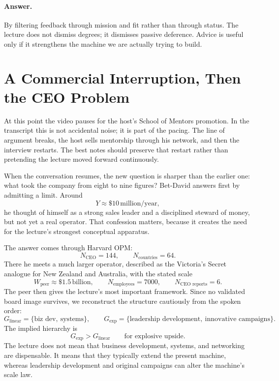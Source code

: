 \paragraph{Answer.} By filtering feedback through mission and fit rather than through status. The lecture does not dismiss degrees; it dismisses passive deference. Advice is useful only if it strengthens the machine we are actually trying to build.

\section{A Commercial Interruption, Then the CEO Problem}

At this point the video pauses for the host's School of Mentors promotion. In the transcript this is not accidental noise; it is part of the pacing. The line of argument breaks, the host sells mentorship through his network, and then the interview restarts. The best notes should preserve that restart rather than pretending the lecture moved forward continuously.

When the conversation resumes, the new question is sharper than the earlier one: what took the company from eight to nine figures? Bet-David answers first by admitting a limit. Around
\begin{equation}
Y \approx \$10\,\text{million/year},
\end{equation}
he thought of himself as a strong sales leader and a disciplined steward of money, but not yet a real operator. That confession matters, because it creates the need for the lecture's strongest conceptual apparatus.

The answer comes through Harvard OPM:
\begin{equation}
N_{\text{CEO}}=144,\qquad N_{\text{countries}}=64.
\end{equation}
There he meets a much larger operator, described as the Victoria's Secret analogue for New Zealand and Australia, with the stated scale
\begin{equation}
W_{\text{peer}} \approx \$1.5\,\text{billion},\qquad
N_{\text{employees}}=7000,\qquad
N_{\text{CEO reports}}=6.
\end{equation}
The peer then gives the lecture's most important framework. Since no validated board image survives, we reconstruct the structure cautiously from the spoken order:
\begin{equation}
G_{\text{linear}}=\{\text{biz dev},\ \text{systems}\},\qquad
G_{\text{exp}}=\{\text{leadership development},\ \text{innovative campaigns}\}.
\end{equation}
The implied hierarchy is
\begin{equation}
G_{\text{exp}} > G_{\text{linear}}
\qquad\text{for explosive upside.}
\end{equation}
The lecture does not mean that business development, systems, and networking are dispensable. It means that they typically extend the present machine, whereas leadership development and original campaigns can alter the machine's scale law.

